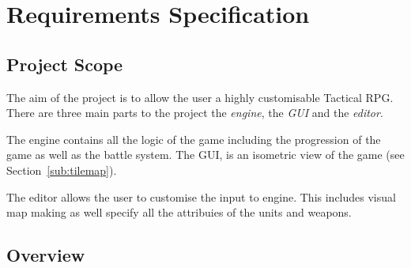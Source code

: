 \section{Requirements Specification}

\subsection{Project Scope}
\label{sub:project_scope}

The aim of the project is to allow the user a highly customisable Tactical RPG.  There are three main parts to the project the \emph{engine}, the \emph{GUI} and the \emph{editor}.

The engine contains all the logic of the game including the progression of the game as well as the battle system. The GUI, is an isometric view of the game (see Section~\ref{sub:tilemap}). 

The editor allows the user to customise the input to engine. This includes visual map making as well specify all the attribuies of the units and weapons. 

\subsection{Overview}
\label{sub:overview}


